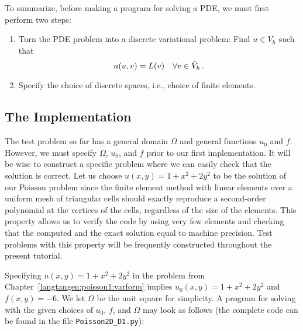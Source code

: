 To summarize, before making a \fenics{} program for solving a PDE,
we must first perform two steps:
\begin{enumerate}
\item Turn the PDE problem into a discrete 
variational problem: Find $u\in V_h$
such that
\[ a(u,v) = L(v)\quad\forall v\in \hat{V}_h\thinspace . \]
\item Specify the choice of discrete spaces, i.e., choice of finite elements.
\end{enumerate}

\subsection{The Implementation}
\label{langtangen:poisson1:impl}

The test problem so far has a general domain $\Omega$ and general functions
$u_0$ and $f$. However, 
we must specify $\Omega$, $u_0$, and $f$ prior to our first implementation.
It will be wise to construct a specific problem where we can easily check
that the solution is correct.
Let us choose $u(x,y)=1 + x^2 + 2y^2$ to be the solution of our
Poisson problem since the finite element method with linear elements
over a uniform mesh of triangular cells
should exactly reproduce a second-order polynomial
at the vertices of the cells, regardless of the size
of the elements. This property allows us to verify the code by
using very few elements and
checking that the computed and the exact solution equal to machine precision.
Test problems with this property will be frequently constructed throughout
the present
tutorial. 

Specifying $u(x,y)=1 + x^2 + 2y^2$ in the
problem from Chapter~\ref{langtangen:poisson1:varform} implies
$u_0(x,y)= 1 + x^2 + 2y^2$
and $f(x,y)=-6$.
We let $\Omega$ be the unit square for simplicity.
A \fenics{} program for solving  with the given choices
of $u_0$, $f$, and $\Omega$ may look as follows (the complete code can be
found in the file {\fontsize{12pt}{12pt}\verb!Poisson2D_D1.py!}):

